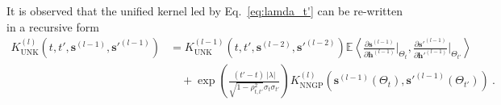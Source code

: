 \documentclass[review,10pt]{JMtemplate}
\begin{document}
It is observed that the unified kernel led by Eq.~\eqref{eq:lamda_t'} can be re-written in a recursive form
\begin{equation}  \label{eq:our_recursive_2}
\begin{aligned}
K_{\textrm{UNK}}^{(l)} \left( t, t', \boldsymbol{s}^{(l-1)}, \boldsymbol{s}'^{(l-1)} \right) 
&= K_{\textrm{UNK}}^{(l-1)} \left( t, t',  \boldsymbol{s}^{(l-2)}, \boldsymbol{s}'^{(l-2)} \right) \mathbb{E} \left\langle \frac{\partial \boldsymbol{s}^{(l-1)}}{\partial \boldsymbol{h}^{(l-1)}} \Big|_{\Theta_t},  \frac{\partial \boldsymbol{s}'^{(l-1)}}{\partial \boldsymbol{h}'^{(l-1)}} \Big|_{\Theta_{t'}} \right\rangle \\
&\quad+ \exp\left( \frac{ (t'-t) ~|\lambda|}{\sqrt{1-\rho_{t,t'}^2}\sigma_{t}\sigma_{t'}} \right) K_{\textrm{NNGP}}^{(l)} \left( \boldsymbol{s}^{(l-1)}(\Theta_t), \boldsymbol{s}'^{(l-1)}(\Theta_{t'}) \right) \ .
\end{aligned} 
\end{equation}
\end{document}
